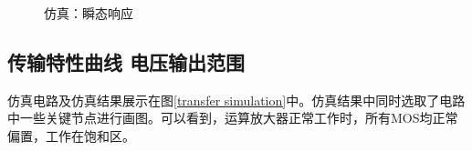 \documentclass[UTF8]{ctexart}
\numberwithin{figure}{subsection}
\numberwithin{table}{subsection}
\numberwithin{equation}{subsection}
\begin{document}
\begin{figure}[H]
    \centering
    \caption{仿真：瞬态响应}
    \label{trans simulation}
\end{figure}

\subsection{传输特性曲线 电压输出范围}
仿真电路及仿真结果展示在图\ref{transfer simulation}中。仿真结果中同时选取了电路中一些关键节点进行画图。可以看到，运算放大器正常工作时，所有MOS均正常偏置，工作在饱和区。
\end{document}
